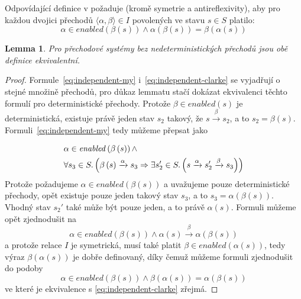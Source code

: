 \documentclass[12pt]{fithesis2}
\newtheorem{lemma}     {Lemma}
\newcommand{\tuple}[1]{\langle #1 \rangle}
\begin{document}
Odpovídající definice v \cite{CLARKE} požaduje (kromě symetrie a antireflexivity), aby pro každou dvojici přechodů $\tuple{\alpha, \beta} \in I$ povolených ve stavu $s \in S $ platilo:
\begin{equation}\label{eq:independent-clarke}
\alpha \in \mathit{enabled}\left({ \beta\left({s}\right) }\right) \land
\alpha\left({\beta\left({s}\right)}\right) = \beta\left({\alpha\left({s}\right)}\right)
\end{equation}

\begin{lemma}
Pro přechodové systémy bez nedeterministických přechodů jsou obě definice ekvivalentní.
\end{lemma}

\begin{proof}
Formule~\ref{eq:independent-my} i~\ref{eq:independent-clarke} se vyjadřují o stejné množině přechodů, pro důkaz lemmatu stačí dokázat ekvivalenci těchto formulí pro deterministické přechody. Protože $\beta \in \mathit{enabled}(s)$ je deterministická, existuje právě jeden stav $s_2$ takový, že $s \xrightarrow{\beta} s_2$, a to $s_2 = \beta\left({s}\right)$. Formuli~\ref{eq:independent-my} tedy můžeme přepsat jako

\begin{equation}
\begin{split}
& \alpha \in \mathit{enabled}\left({\beta\left({s}\right)}\right)
\land \\
&\forall s_3 \in S \ldotp \left({
	\beta\left({s}\right) \xrightarrow{\alpha} s_3
	\Rightarrow
	\exists s_2' \in S \ldotp \left({
		s \xrightarrow{\alpha} s_2' \xrightarrow{\beta} s_3
	}\right)
}\right)
\end{split}
\end{equation}
Protože požadujeme $\alpha \in \mathit{enabled}\left({\beta\left({s}\right)}\right)$ a uvažujeme pouze deterministické přechody, opět existuje pouze jeden takový stav $s_3$, a to $s_3 = \alpha{\left({\beta\left({s}\right)}\right)}$. Vhodný stav $s_2'$ také může být pouze jeden, a to právě $\alpha\left({s}\right)$. Formuli můžeme opět zjednodušit na
\begin{equation}
\alpha \in \mathit{enabled}\left({\beta\left({s}\right)}\right)
\land
\alpha\left({s}\right) \xrightarrow{\beta} \alpha{\left({\beta\left({s}\right)}\right)}
\end{equation}
a protože relace $I$ je symetrická, musí také platit $\beta \in \mathit{enabled}\left({\alpha\left({s}\right)}\right)$, tedy výraz $\beta\left({\alpha\left({s}\right)}\right)$ je dobře definovaný, díky čemuž můžeme formuli zjednodušit do podoby
\begin{equation}
\alpha \in \mathit{enabled}\left({\beta\left({s}\right)}\right)
\land
\beta\left({\alpha\left({s}\right)}\right) = \alpha{\left({\beta\left({s}\right)}\right)}
\end{equation}
ve které je ekvivalence s \ref{eq:independent-clarke} zřejmá.
\end{proof}
\end{document}
